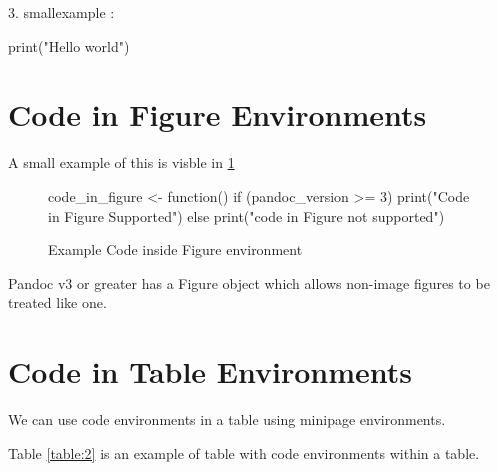 3. smallexample :

\begin{smallexample}
print("Hello world")
\end{smallexample}

\section{Code in Figure Environments}
A small example of this is visble in \ref{code:example}

\begin{figure}[htbp]
\begin{Sinput}
code_in_figure <- function() {
  if (pandoc_version >= 3) {
    print("Code in Figure Supported")
  }
  else {
    print("code in Figure not supported")
  }
}
\end{Sinput}
\caption{ Example Code inside Figure environment}
\label{code:example}
\end{figure}
Pandoc v3 or greater \citep{pandoc} has a Figure object which allows non-image
figures to be treated like one.

\section{Code in Table Environments}
We can use code environments in a table using minipage environments.

Table \ref{table:2} is an example of table with code environments within a table.

